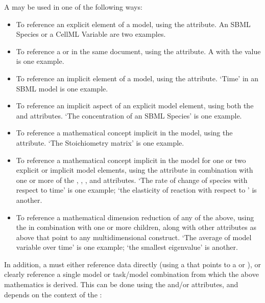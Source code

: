 A \Variable may be used in one of the following ways:
\begin{itemize}
        \item To reference an explicit element of a model, using the  attribute.  An SBML Species or a CellML Variable are two examples.
        \item To reference a \DataGenerator or \DataSource in the same document, using the  attribute.  A  with the value  is one example.
        \item To reference an implicit element of a model, using the  attribute.  `Time' in an SBML model is one example.
        \item To reference an implicit aspect of an explicit model element, using both the  and  attributes.  `The concentration of an SBML Species' is one example.
        \item To reference a mathematical concept implicit in the model, using the  attribute.  `The Stoichiometry matrix' is one example.
        \item To reference a mathematical concept implicit in the model for one or two explicit or implicit model elements, using the  attribute in combination with one or more of the , , , and  attributes.  `The rate of change of species  with respect to time' is one example; `the elasticity of reaction  with respect to ' is another.
        \item To reference a mathematical dimension reduction of any of the above, using the  in combination with one or more \AppliedDimension children, along with other attributes as above that point to any multidimensional construct.  `The average of model variable  over time' is one example; `the smallest eigenvalue' is another.
\end{itemize}

In addition, a \Variable must either reference data directly (using a  that points to a \DataSource or \DataGenerator), or clearly reference a single model or task/model combination from which the above mathematics is derived.  This can be done using the  and/or  attributes, and depends on the context of the \Variable:


